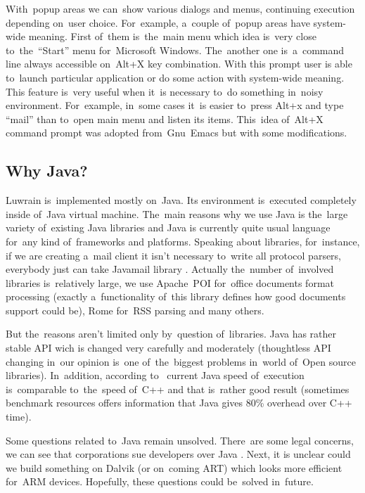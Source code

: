 \documentclass{acm_proc_article-sp}
\begin{document}
With~popup areas we can~show various dialogs and menus,
continuing execution depending on~user choice.
For~example, a~couple of~popup areas have system-wide meaning.
First of~them is~the~main menu which idea is~very close to~the~``Start'' menu for~Microsoft Windows.
The~another one is~a~command line always accessible on~Alt+X key combination.
With this prompt user is able to~launch  particular application or do some action with system-wide meaning.
This feature is~very useful when it~is necessary to~do something in~noisy environment.
For~example, in~some cases it~is easier to~press Alt+x and type ``mail'' than to~open main menu and listen its items.
This~idea of~Alt+X command prompt was adopted from~Gnu~Emacs but with some modifications.

\subsection{Why Java?}

Luwrain is~implemented mostly on~Java.
Its environment is~executed completely inside of~Java virtual machine.
The~main reasons why we use Java is the~large variety of~existing Java libraries
and Java is currently quite usual language for~any kind of~frameworks and platforms.
Speaking about libraries, for~instance, if  we are creating a~mail client it isn't necessary to~write all protocol parsers,
everybody just can take Javamail library \cite{javamail}.
Actually the~number of~involved libraries is~relatively large,
we use Apache~POI \cite{poi} for~office documents format processing 
(exactly a~functionality of~this library defines how good documents support could be),
Rome \cite{rome} for~RSS parsing  
and many others.

But the~reasons aren't limited only by~question of~libraries.
Java has rather stable API wich is changed very carefully and moderately 
(thoughtless API changing in~our opinion is~one of~the~biggest problems in~world of~Open source libraries).
In~addition, according to~\cite{javaspeed} 
current Java speed of~execution is~comparable to~the~speed of~C++
and that is~rather good result
(sometimes benchmark resources offers information that Java gives 80\% overhead over C++ time).

Some questions related to~Java remain unsolved. 
There~are some legal concerns, we can see that corporations sue developers over Java \cite{oraclesue}.
Next, it is unclear could we build something on Dalvik (or on~coming ART) \cite{dalvik}
which looks more efficient for~ARM devices.
Hopefully, these questions could be~solved in~future.
\end{document}
